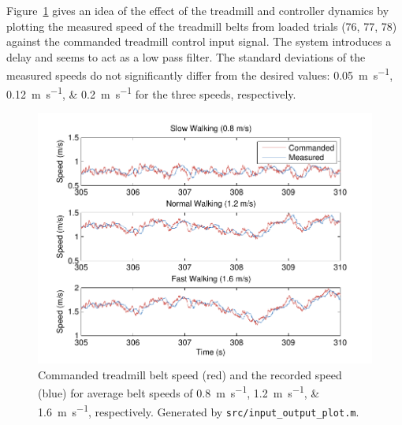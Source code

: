 \documentclass[fleqn,12pt]{wlpeerj}
\begin{document}
Figure~\ref{fig:input_output} gives an idea of the effect of the treadmill and
controller dynamics by plotting the measured speed of the treadmill belts from
loaded trials (76, 77, 78) against the commanded treadmill control input
signal. The system introduces a delay and seems to act as a low pass filter.
The standard deviations of the measured speeds do not significantly differ from
the desired values: \SIlist{0.05;0.12;0.2}{\meter\per\second} for the three
speeds, respectively.
%
\begin{figure}
  \centering
  \includegraphics{figures/input_vs_output.pdf}
  \cprotect\caption{Commanded treadmill belt speed (red) and the recorded speed
    (blue) for average belt speeds of \SIlist{0.8;1.2;1.6}{\meter\per\second},
    respectively. Generated by \verb|src/input_output_plot.m|.}
  \label{fig:input_output}
\end{figure}
\end{document}

